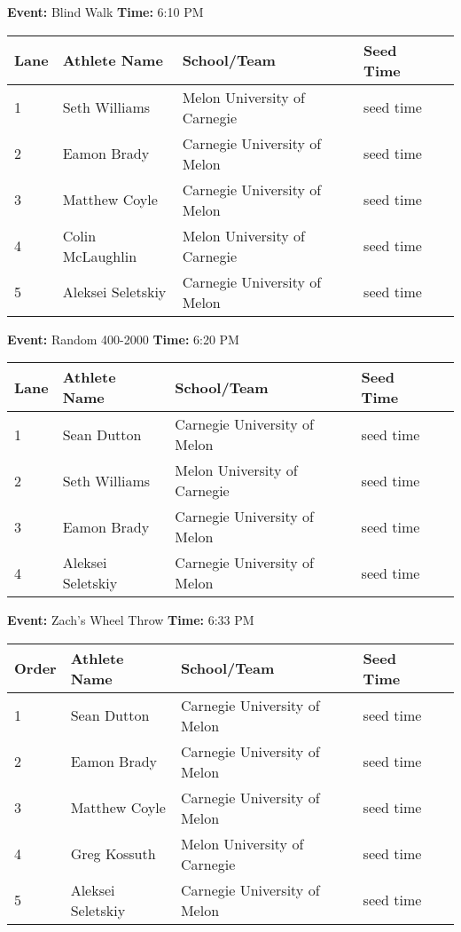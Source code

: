 \documentclass[11pt]{article}
\begin{document}
\textbf{Event:} Blind Walk \quad \textbf{Time:} 6:10 PM 

\vspace{1em}
\begin{tabular}{@{}lllll@{}}
\toprule

\textbf{Lane} & \textbf{Athlete Name} & \textbf{School/Team} & \textbf{Seed Time} \\
\midrule
1 & Seth Williams & Melon University of Carnegie & seed time &\\
2 & Eamon Brady & Carnegie University of Melon & seed time &\\
3 & Matthew Coyle & Carnegie University of Melon & seed time &\\
4 & Colin McLaughlin & Melon University of Carnegie & seed time &\\
5 & Aleksei Seletskiy & Carnegie University of Melon & seed time &\\
\bottomrule
\end{tabular}
\vspace{2.5em}


\textbf{Event:} Random 400-2000 \quad \textbf{Time:} 6:20 PM 

\vspace{1em}
\begin{tabular}{@{}lllll@{}}
\toprule

\textbf{Lane} & \textbf{Athlete Name} & \textbf{School/Team} & \textbf{Seed Time} \\
\midrule
1 & Sean Dutton & Carnegie University of Melon & seed time &\\
2 & Seth Williams & Melon University of Carnegie & seed time &\\
3 & Eamon Brady & Carnegie University of Melon & seed time &\\
4 & Aleksei Seletskiy & Carnegie University of Melon & seed time &\\
\bottomrule
\end{tabular}
\vspace{2.5em}


\textbf{Event:} Zach's Wheel Throw \quad \textbf{Time:} 6:33 PM 

\vspace{1em}
\begin{tabular}{@{}lllll@{}}
\toprule

\textbf{Order} & \textbf{Athlete Name} & \textbf{School/Team} & \textbf{Seed Time} \\
\midrule
1 & Sean Dutton & Carnegie University of Melon & seed time &\\
2 & Eamon Brady & Carnegie University of Melon & seed time &\\
3 & Matthew Coyle & Carnegie University of Melon & seed time &\\
4 & Greg Kossuth & Melon University of Carnegie & seed time &\\
5 & Aleksei Seletskiy & Carnegie University of Melon & seed time &\\
\bottomrule
\end{tabular}
\vspace{2.5em}
\end{document}
